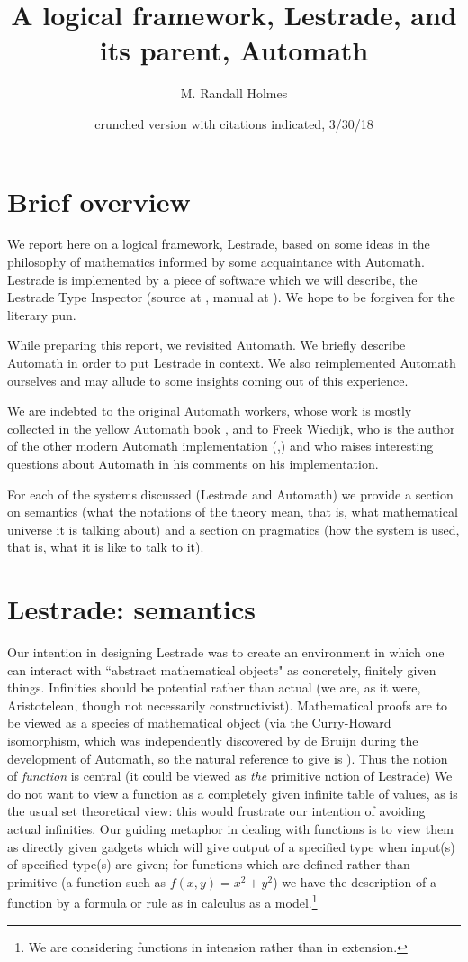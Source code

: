 \documentclass{article}
\title{A logical framework, Lestrade, and its parent, Automath}
\author{M. Randall Holmes}
\date{crunched version with citations indicated, 3/30/18}
\begin{document}
\maketitle

\section{Brief overview}

We report here on a logical framework, Lestrade, based on some ideas in the philosophy of mathematics informed by some acquaintance with Automath.  Lestrade is implemented by a piece of software which we will describe, the Lestrade Type Inspector (source at \cite{lestradesource}, manual at \cite{lestrademanual}).  We hope to be forgiven for the literary pun.

While preparing this report, we revisited Automath.  We briefly describe Automath in order to put Lestrade in context.  We also reimplemented Automath ourselves and may allude to some insights coming out of this experience.

We are indebted to the original Automath workers, whose work is mostly collected in the yellow Automath book \cite{yellowbook}, and to Freek Wiedijk, who is the  author of the other modern Automath implementation (\cite{autmanual},\cite{autpaper}) and who raises  interesting questions about Automath in his comments on  his implementation.

For each of the systems discussed (Lestrade and Automath) we provide a section on semantics (what the notations of the theory mean, that is, what mathematical universe it is talking about) and a section on pragmatics (how the system is used, that is, what it is like to talk to it).

\section{Lestrade:  semantics}

 Our intention in designing Lestrade was to create an environment in which one can interact with ``abstract mathematical objects"  as concretely, finitely given things.  Infinities should be potential rather than actual (we are, as it were, Aristotelean, though not necessarily constructivist).  Mathematical proofs are to be viewed as a species of mathematical object (via the Curry-Howard isomorphism, which was independently discovered by de Bruijn during the development of Automath, so the natural reference to give is \cite{debruijna2}).  Thus the notion of {\em function\/} is central (it could be viewed as {\em the\/} primitive notion of Lestrade)  We do not want to view a function as a completely given infinite table of values, as is the usual set theoretical view:  this would frustrate our intention of avoiding actual infinities.  Our guiding metaphor in dealing with functions is to view them as directly given gadgets which will give output of a specified type when input(s) of specified type(s) are given;  for functions which are defined rather than primitive (a function such as $f(x,y)=x^2+y^2$) we have the description of a function by a formula or rule as in calculus as a model.\footnote{We are considering functions in intension rather than in extension.}
\end{document}
